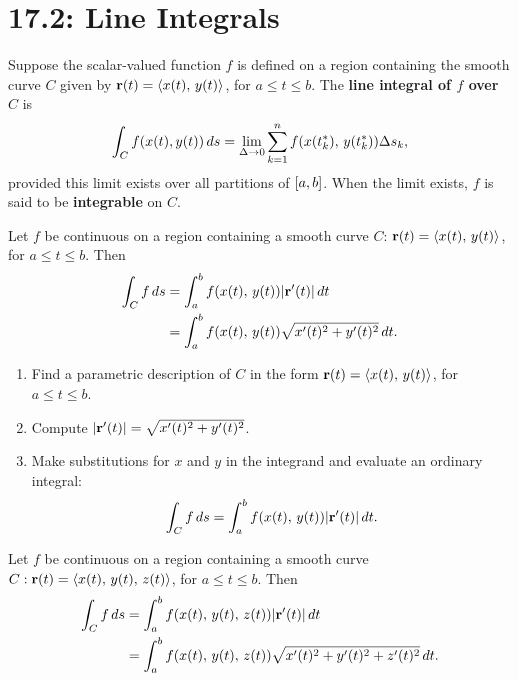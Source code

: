 \documentclass[mathNotesPreamble]{subfiles}
\begin{document}
\section{17.2: Line Integrals}

  \begin{defn*}
    Suppose the scalar-valued function $f$ is defined on a region containing the smooth curve $C$ given by ${\mathbf{r}}(t)= {\left\langle x(t),\,y(t) \right\rangle}$, for $a\leq t\leq b$. The \textbf{line integral of $f$ over $C$} is
      \[\int_C f{\left(x(t), y(t)\right)}\,ds=\lim_{\Delta\to 0} \sum_{k=1}^n f{\left(x(t_k^*),\,y(t_k^*)\right)}\Delta s_k,\]
    provided this limit exists over all partitions of ${\left[a,b\right]}$. When the limit exists, $f$ is said to be \textbf{integrable} on $C$.
  \end{defn*}

  \begin{thmBox*}
    Let $f$ be continuous on a region containing a smooth curve $C$: ${\mathbf{r}}(t)={\left\langle x(t),\,y(t) \right\rangle}$, for $a\leq t\leq b$. Then
    \begin{align*}
      \int_C f\,ds&= \int_a^b f{\left(x(t),\,y(t)\right)}{\left\vert{\mathbf{r}}'(t)\right\vert}\,dt\\
        &=\int_a^b f{\left(x(t),\,y(t)\right)}\sqrt{x'(t)^2+y'(t)^2}\,dt.
    \end{align*}
  \end{thmBox*}

  \begin{thmBox*}
    \begin{enumerate}
      \item 
        Find a parametric description of $C$ in the form ${\mathbf{r}}(t)={\left\langle x(t),\,y(t) \right\rangle}$, for $a\leq t\leq b$.
      \item 
        Compute ${\left\vert{\mathbf{r}}'(t)\right\vert}=\sqrt{x'(t)^2+y'(t)^2}$.
      \item 
        Make substitutions for $x$ and $y$ in the integrand and evaluate an ordinary integral:
          \[\int_C f\,ds = \int_a^b f{\left(x(t),\,y(t)\right)}{\left\vert{\mathbf{r}}'(t)\right\vert}\,dt.\]
    \end{enumerate}
  \end{thmBox*}

  \begin{thmBox*}
    Let $f$ be continuous on a region containing a smooth curve $C: {\mathbf{r}}(t)={\left\langle x(t),\,y(t),\,z(t) \right\rangle}$, for $a\leq t\leq b$. Then
    \begin{align*}
      \int_C f\,ds&= \int_a^b f{\left(x(t),\,y(t),\,z(t)\right)}{\left\vert{\mathbf{r}}'(t)\right\vert}\,dt\\
        &= \int_a^b  f{\left(x(t),\,y(t),\,z(t)\right)}\sqrt{x'(t)^2+y'(t)^2+z'(t)^2}\,dt.
    \end{align*}
  \end{thmBox*}
\end{document}
